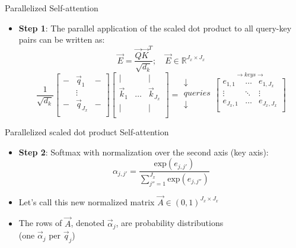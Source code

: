 \begin{vbframe}{Parallelized Self-attention}

\vfill

\begin{itemize}
\item \textbf{Step 1}: The parallel application of the scaled dot product to all query-key pairs can be written as:
$$\vec {E} = \frac{ \vec {Q} \vec {K}^T}{\sqrt{d_k}}; \quad \vec E \in \mathbb{R}^{J_x \times J_x}$$
$$ \frac{1}{\sqrt{d_k}}
\begin{bmatrix} 
- & \vec q_1  & -  \\
& \vdots & \\
-  & \vec q_{J_x}  &  -  \\
\end{bmatrix}  
\begin{bmatrix} 
\lvert &  & \lvert  \\
\vec k_1 & \ldots & \vec k_{J_x} \\
\lvert &  & \lvert  \\
\end{bmatrix}
= 
\begin{matrix} \downarrow \\ queries \\ \downarrow \\ \end{matrix} \overset{\rightarrow keys \rightarrow}{
\begin{bmatrix}
e_{1,1} & \ldots & e_{1,J_x} \\
\vdots & \ddots & \vdots \\
e_{J_x,1} & \ldots & e_{J_x,J_x} \\
\end{bmatrix}}$$
\end{itemize}

\vfill

\end{vbframe}


\begin{vbframe}{Parallelized scaled dot product Self-attention}

\vfill

\begin{itemize}
\item \textbf{Step 2}: Softmax with normalization over the second axis (key axis): 
$$\alpha_{j,j'} = \frac{\mathrm{exp}(e_{j,j'})}{\sum_{j''=1}^{J_x} \mathrm{exp}(e_{j,j''})}$$
\item Let's call this new normalized matrix $\vec A \in (0,1)^{J_x \times J_x}$
\item The rows of $\vec A$, denoted $\vec \alpha_j$, are probability distributions\\ (one $\vec \alpha_j$ per $\vec q_j$)
\end{itemize}

\vfill

\end{vbframe}


